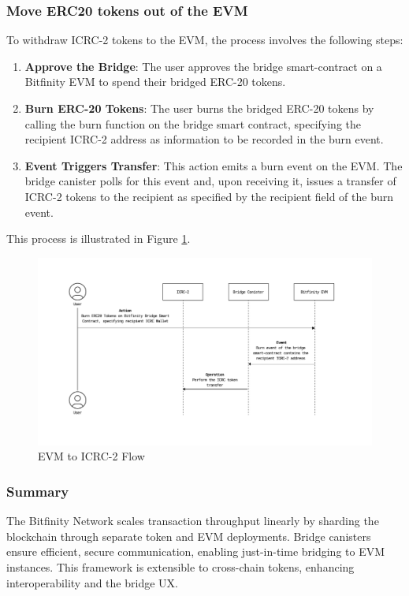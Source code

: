 \documentclass{article}
\begin{document}
\subsubsection{Move ERC20 tokens out of the EVM}

To withdraw ICRC-2 tokens to the EVM, the process involves the following steps:

\begin{enumerate}
\item \textbf{Approve the Bridge}: The user approves the bridge smart-contract on a Bitfinity EVM to spend their bridged ERC-20 tokens.
\item \textbf{Burn ERC-20 Tokens}: The user burns the bridged ERC-20 tokens by calling the burn function on the bridge smart contract, specifying the recipient ICRC-2 address as information to be recorded in the burn event.
\item \textbf{Event Triggers Transfer}: This action emits a burn event on the EVM. The bridge canister polls for this event and, upon receiving it, issues a transfer of ICRC-2 tokens to the recipient as specified by the recipient field of the burn event.
\end{enumerate}

This process is illustrated in Figure \ref{fig
}.

\begin{figure}[H]
\centering
\includegraphics[width=1\linewidth]{evm-icrc.png}
\caption{EVM to ICRC-2 Flow}
\label{fig
}
\end{figure}

\subsubsection{Summary}

The Bitfinity Network scales transaction throughput linearly by sharding the blockchain through separate token and EVM deployments. Bridge canisters ensure efficient, secure communication, enabling just-in-time bridging to EVM instances. This framework is extensible to cross-chain tokens, enhancing interoperability and the bridge UX.
\end{document}

